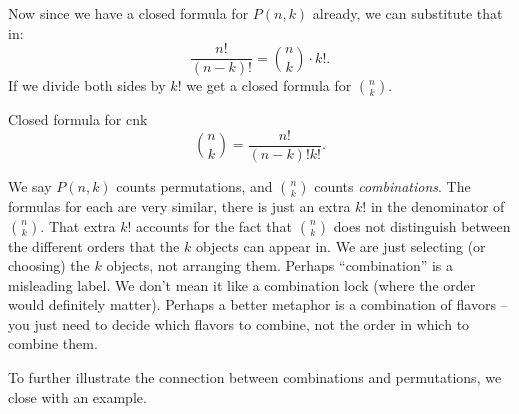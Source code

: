 \documentclass[12pt]{article}
\begin{document}
Now since we have a closed formula for $P(n,k)$ already, we can substitute that in:
\[\frac{n!}{(n-k)!} = {n \choose k} \cdot k!.\]
If we divide both sides by $k!$ we get a closed formula for ${n \choose k}$.

\begin{defbox}{Closed formula for \gls{cnk}}
  \[{n \choose k} = \frac{n!}{(n-k)!k!}.\]
\end{defbox}

We say $P(n,k)$ counts permutations, and ${n \choose k}$ counts \emph{combinations}.  The formulas for each are very similar, there is just an extra $k!$ in the denominator of ${n \choose k}$.  That extra $k!$ accounts for the fact that ${n \choose k}$ does not distinguish between the different orders that the $k$ objects can appear in.  We are just selecting (or choosing) the $k$ objects, not arranging them.  Perhaps ``combination'' is a misleading label.  We don't mean it like a combination lock (where the order would definitely matter).  Perhaps a better metaphor is a combination of flavors -- you just need to decide which flavors to combine, not the order in which to combine them.

To further illustrate the connection between combinations and permutations, we close with an example.
\end{document}
